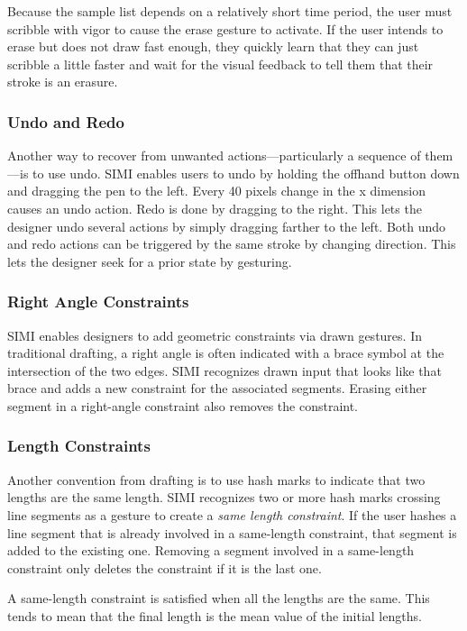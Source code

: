 \documentclass{article}
\begin{document}
Because the sample list depends on a relatively short time period, the
user must scribble with vigor to cause the erase gesture to
activate. If the user intends to erase but does not draw fast enough,
they quickly learn that they can just scribble a little faster and
wait for the visual feedback to tell them that their stroke is an
erasure.

\subsubsection{Undo and Redo}

Another way to recover from unwanted actions---particularly a sequence
of them---is to use undo. SIMI enables users to undo by holding the
offhand button down and dragging the pen to the left. Every 40 pixels
change in the x dimension causes an undo action. Redo is done by
dragging to the right. This lets the designer undo several actions by
simply dragging farther to the left. Both undo and redo actions can be
triggered by the same stroke by changing direction. This lets the
designer seek for a prior state by gesturing.

\subsubsection{Right Angle Constraints}

SIMI enables designers to add geometric constraints via drawn
gestures. In traditional drafting, a right angle is often indicated
with a brace symbol at the intersection of the two edges. SIMI
recognizes drawn input that looks like that brace and adds a new
constraint for the associated segments. Erasing either segment in a
right-angle constraint also removes the constraint.

\subsubsection{Length Constraints}

Another convention from drafting is to use hash marks to indicate that
two lengths are the same length. SIMI recognizes two or more hash
marks crossing line segments as a gesture to create a \textit{same
  length constraint}. If the user hashes a line segment that is
already involved in a same-length constraint, that segment is added to
the existing one. Removing a segment involved in a same-length
constraint only deletes the constraint if it is the last one.

A same-length constraint is satisfied when all the lengths are the
same. This tends to mean that the final length is the mean value of
the initial lengths.
\end{document}
